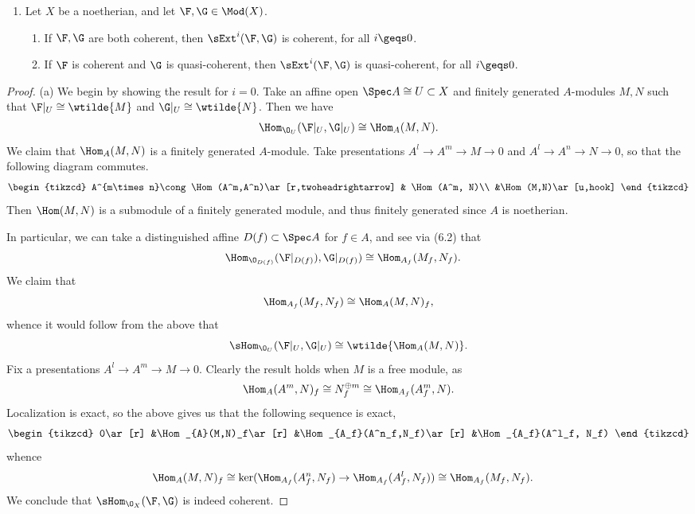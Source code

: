 \documentclass[12pt]{amsart}
\begin{document}
\begin{enumerate}
  \item[6.3.] {
      Let $X$ be a noetherian, and let $\F,\G\in \Mod(X)$.
      \begin{enumerate}
        \item If $\F,\G$ are both coherent, then $\sExt^i(\F,\G)$ is coherent, for all $i\geqs 0$.
        \item If $\F$ is coherent and $\G$ is quasi-coherent, then $\sExt^i(\F,\G)$ is quasi-coherent, for all $i\geqs 0$.
      \end{enumerate}
    }
\end{enumerate}

\begin{proof}
  (a) We begin by showing the result for $i=0$.
  Take an affine open $\Spec A\cong U\subset X$ and finitely generated $A$-modules $M,N$ such that $\F|_U\cong \wtilde{M}$ and $\G|_U\cong \wtilde{N}$.
  Then we have
  \begin{align*}
    \Hom_{\O_U}(\F|_U,\G|_U)\cong \Hom_A(M,N).
  \end{align*}
  We claim that $\Hom_A(M,N)$ is a finitely generated $A$-module.
  Take presentations $A^l\to A^m\to M\to 0$ and $A^l\to A^n\to N\to 0$, so that the following diagram commutes.
  \[
    \begin{tikzcd}
      A^{m\times n}\cong \Hom(A^m,A^n)\ar[r,twoheadrightarrow] & \Hom(A^m, N)\\
                                            &\Hom(M,N)\ar[u,hook]
    \end{tikzcd}
  \] 
  Then $\Hom(M,N)$ is a submodule of a finitely generated module, and thus finitely generated since $A$ is noetherian.

  In particular, we can take a distinguished affine $D(f)\subset \Spec A$ for $f\in A$, and see via (6.2) that
  \begin{align*}
    \Hom_{\O_{D(f)}}(\F|_{D(f)}),\G|_{D(f)})
      &\cong \Hom_{A_f}(M_f,N_f).
  \end{align*}
  We claim that
  \[
    \Hom_{A_f}(M_f,N_f) \cong \Hom_A(M,N)_f,
  \] 
  whence it would follow from the above that
  \[
    \sHom_{\O_U}(\F|_U,\G|_U)\cong \wtilde{\Hom_A(M,N)}.
  \] 
  Fix a presentations $A^l\to A^m\to M\to 0$. %
  Clearly the result holds when $M$ is a free module, as 
  \[
    \Hom_A(A^m,N)_f\cong N^{\oplus m}_f \cong \Hom_{A_f}(A_f^m,N).
  \]
  Localization is exact, so the above gives us that the following sequence is exact,
  \[
    \begin{tikzcd}
      0\ar[r] &\Hom_{A}(M,N)_f\ar[r] &\Hom_{A_f}(A^n_f,N_f)\ar[r] &\Hom_{A_f}(A^l_f, N_f)
    \end{tikzcd}
  \] 
  whence
  \begin{align*}
    \Hom_A(M,N)_f 
      &\cong \ker(\Hom_{A_f}(A_f^n,N_f)\to \Hom_{A_f}(A_f^l,N_f))\cong \Hom_{A_f}(M_f,N_f).
  \end{align*}
  We conclude that $\sHom_{\O_X}(\F,\G)$ is indeed coherent.


\end{proof}
\end{document}
